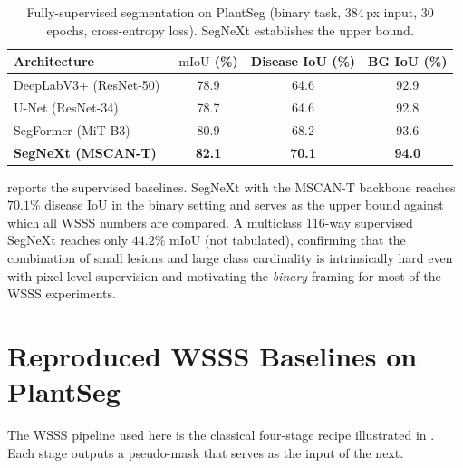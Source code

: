 \documentclass[11pt,a4paper]{article}
\newcommand{\mIoU}{\mathrm{mIoU}}
\begin{document}
\begin{table}[t]
\centering
\small
\caption{Fully-supervised segmentation on PlantSeg (binary task, 384\,px
input, 30 epochs, cross-entropy loss). SegNeXt
establishes the upper bound.}
\label{tab:upperbound}
\begin{tabular}{@{}lccc@{}}
\toprule
Architecture & $\mIoU$ (\%) & Disease IoU (\%) & BG IoU (\%)\\
\midrule
DeepLabV3+ (ResNet-50)~\citep{deeplabv3p} & 78.9 & 64.6 & 92.9 \\
U-Net (ResNet-34)                         & 78.7 & 64.6 & 92.8 \\
SegFormer (MiT-B3)~\citep{segformer}       & 80.9 & 68.2 & 93.6 \\
\textbf{SegNeXt (MSCAN-T)}~\citep{segnext} & \textbf{82.1} & \textbf{70.1} & \textbf{94.0} \\
\bottomrule
\end{tabular}
\end{table}

 reports the supervised baselines. SegNeXt with the
MSCAN-T backbone reaches $70.1\%$ disease IoU in the binary setting and
serves as the upper bound against which all WSSS numbers are compared. A
multiclass 116-way supervised SegNeXt reaches only $44.2\%$ $\mIoU$
(not tabulated), confirming that the combination of small lesions and
large class cardinality is intrinsically hard even with pixel-level
supervision and motivating the \emph{binary} framing for most of the
WSSS experiments.

\section{Reproduced WSSS Baselines on PlantSeg}
\label{sec:wsss-baselines}

The WSSS pipeline used here is the classical four-stage recipe
illustrated in . Each stage outputs a pseudo-mask
that serves as the input of the next.
\end{document}
